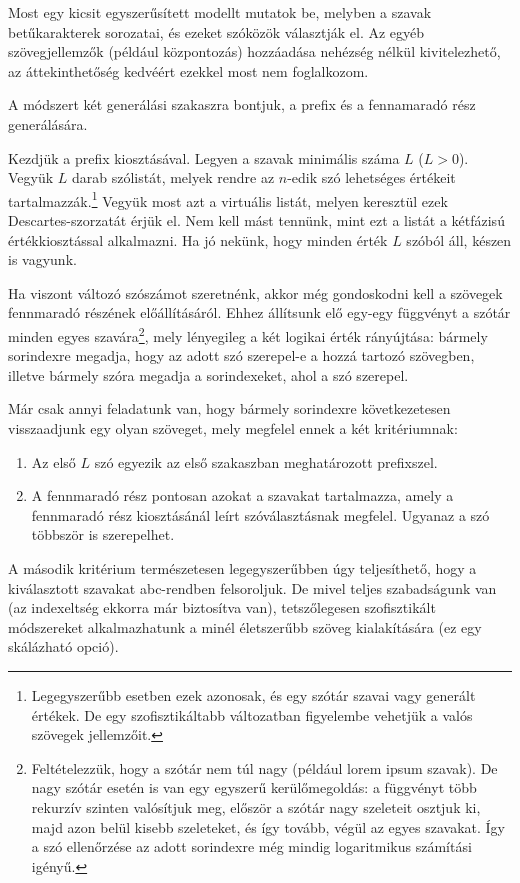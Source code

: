 \documentclass[
    parspace,
    noindent,
    nohyp,
]{elteiktdk}[2023/04/10]
\begin{document}
Most egy kicsit egyszerűsített modellt mutatok be,
melyben a szavak betűkarakterek sorozatai,
és ezeket szóközök választják el.
Az egyéb szövegjellemzők (például központozás) hozzáadása nehézség nélkül kivitelezhető,
az áttekinthetőség kedvéért ezekkel most nem foglalkozom.

A módszert két generálási szakaszra bontjuk, a prefix és a fennamaradó rész generálására.

Kezdjük a prefix kiosztásával.
Legyen a szavak minimális száma $L$ ($L > 0$).
Vegyük $L$ darab szólistát, melyek rendre az $n$-edik szó lehetséges értékeit tartalmazzák.\footnote{
  Legegyszerűbb esetben ezek azonosak, és egy szótár szavai vagy generált értékek.
  De egy szofisztikáltabb változatban figyelembe vehetjük a valós szövegek jellemzőit.
}
Vegyük most azt a virtuális listát, melyen keresztül ezek Descartes-szorzatát érjük el.
Nem kell mást tennünk, mint ezt a listát a kétfázisú értékkiosztással alkalmazni.
Ha jó nekünk, hogy minden érték $L$ szóból áll, készen is vagyunk.

Ha viszont változó szószámot szeretnénk,
akkor még gondoskodni kell a szövegek fennmaradó részének előállításáról.
Ehhez állítsunk elő egy-egy függvényt a szótár minden egyes szavára\footnote{
  Feltételezzük, hogy a szótár nem túl nagy (például lorem ipsum szavak).
  De nagy szótár esetén is van egy egyszerű kerülőmegoldás:
  a függvényt több rekurzív szinten valósítjuk meg,
  először a szótár nagy szeleteit osztjuk ki,
  majd azon belül kisebb szeleteket, és így tovább, végül az egyes szavakat.
  Így a szó ellenőrzése az adott sorindexre még mindig logaritmikus számítási igényű.
}, mely lényegileg a két logikai érték rányújtása:
bármely sorindexre megadja, hogy az adott szó szerepel-e a hozzá tartozó szövegben,
illetve bármely szóra megadja a sorindexeket, ahol a szó szerepel.

Már csak annyi feladatunk van, hogy bármely sorindexre következetesen visszaadjunk egy olyan szöveget,
mely megfelel ennek a két kritériumnak:

\begin{enumerate}
  \item Az első $L$ szó egyezik az első szakaszban meghatározott prefixszel.
  \item A fennmaradó rész pontosan azokat a szavakat tartalmazza,
        amely a fennmaradó rész kiosztásánál leírt szóválasztásnak megfelel.
        Ugyanaz a szó többször is szerepelhet.
\end{enumerate}

A második kritérium természetesen legegyszerűbben úgy teljesíthető,
hogy a kiválasztott szavakat abc-rendben felsoroljuk.
De mivel teljes szabadságunk van (az indexeltség ekkorra már biztosítva van),
tetszőlegesen szofisztikált módszereket alkalmazhatunk a minél életszerűbb szöveg kialakítására
(ez egy skálázható opció).
\end{document}
